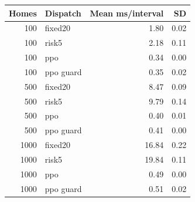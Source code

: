 \begin{tabular}{rlrr}
\toprule
Homes & Dispatch & Mean ms/interval & SD \\
\midrule
100 & fixed20 & 1.80 & 0.02 \\
100 & risk5 & 2.18 & 0.11 \\
100 & ppo & 0.34 & 0.00 \\
100 & ppo guard & 0.35 & 0.02 \\
500 & fixed20 & 8.47 & 0.09 \\
500 & risk5 & 9.79 & 0.14 \\
500 & ppo & 0.40 & 0.01 \\
500 & ppo guard & 0.41 & 0.00 \\
1000 & fixed20 & 16.84 & 0.22 \\
1000 & risk5 & 19.84 & 0.11 \\
1000 & ppo & 0.49 & 0.00 \\
1000 & ppo guard & 0.51 & 0.02 \\
\bottomrule
\end{tabular}
